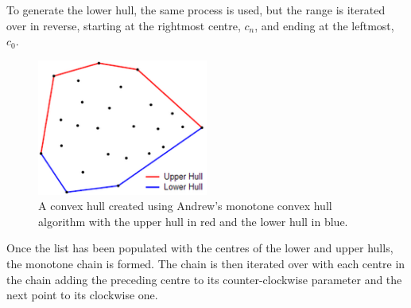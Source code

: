 \\
\\
To generate the lower hull, the same process is used, but the range is iterated over in reverse, starting at the rightmost centre, $c_n$, and ending at the leftmost, $c_0$.
\begin{figure}[H]
\centering
\includegraphics[width=0.5\textwidth]{Images/andrewmonotone.png}
\caption[]{A convex hull created using Andrew's monotone convex hull algorithm with the upper hull in red and the lower hull in blue\footnotemark.}
\label{fig:andrewmonotone}
\end{figure}
Once the list has been populated with the centres of the lower and upper hulls, the monotone chain is formed. The chain is then iterated over with each centre in the chain adding the preceding centre to its counter-clockwise parameter and the next point to its clockwise one.

